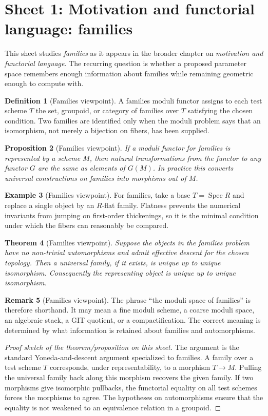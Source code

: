 \documentclass[11pt]{amsart}
\newtheorem{theorem}{Theorem}[section]
\newtheorem{proposition}[theorem]{Proposition}
\theoremstyle{definition}
\newtheorem{definition}[theorem]{Definition}
\newtheorem{example}[theorem]{Example}
\newtheorem{remark}[theorem]{Remark}
\newcommand{\Spec}{\operatorname{Spec}}
\begin{document}
\section{Sheet 1: Motivation and functorial language: families}
This sheet studies \emph{families} as it appears in the broader chapter on \emph{motivation and functorial language}.  The recurring question is whether a proposed parameter space remembers enough information about families while remaining geometric enough to compute with.
\begin{definition}[Families viewpoint]
A families moduli functor assigns to each test scheme $T$ the set, groupoid, or category of families over $T$ satisfying the chosen condition.  Two families are identified only when the moduli problem says that an isomorphism, not merely a bijection on fibers, has been supplied.
\end{definition}
\begin{proposition}[Families viewpoint]
If a moduli functor for families is represented by a scheme $M$, then natural transformations from the functor to any functor $G$ are the same as elements of $G(M)$.  In practice this converts universal constructions on families into morphisms out of $M$.
\end{proposition}
\begin{example}[Families viewpoint]
For families, take a base $T=\Spec R$ and replace a single object by an $R$-flat family.  Flatness prevents the numerical invariants from jumping on first-order thickenings, so it is the minimal condition under which the fibers can reasonably be compared.
\end{example}
\begin{theorem}[Families viewpoint]
Suppose the objects in the families problem have no non-trivial automorphisms and admit effective descent for the chosen topology.  Then a universal family, if it exists, is unique up to unique isomorphism.  Consequently the representing object is unique up to unique isomorphism.
\end{theorem}
\begin{remark}[Families viewpoint]
The phrase ``the moduli space of families'' is therefore shorthand.  It may mean a fine moduli scheme, a coarse moduli space, an algebraic stack, a GIT quotient, or a compactification.  The correct meaning is determined by what information is retained about families and automorphisms.
\end{remark}
\begin{proof}[Proof sketch of the theorem/proposition on this sheet]
The argument is the standard Yoneda-and-descent argument specialized to families.  A family over a test scheme $T$ corresponds, under representability, to a morphism $T\to M$.  Pulling the universal family back along this morphism recovers the given family.  If two morphisms give isomorphic pullbacks, the functorial equality on all test schemes forces the morphisms to agree.  The hypotheses on automorphisms ensure that the equality is not weakened to an equivalence relation in a groupoid.
\end{proof}
\end{document}
